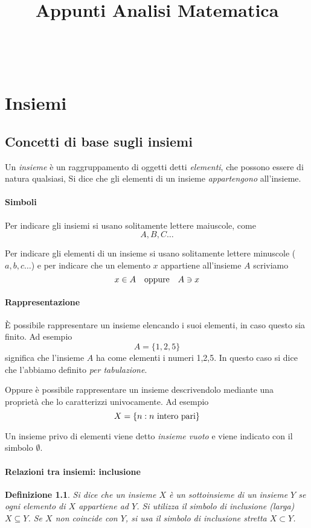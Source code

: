 \documentclass[11pt]{book}
\title{Appunti Analisi Matematica}
\newtheorem{definition}{Definizione}[chapter]
\begin{document}
\tableofcontents
\
\newpage
{}
\chapter{Insiemi}
\section{Concetti di base sugli insiemi}
Un \textit{insieme} è un raggruppamento di oggetti detti \textit{elementi}, che possono essere di natura qualsiasi, Si 
dice che gli elementi di un insieme \textit{appartengono} all'insieme.
\subsubsection{Simboli}
Per indicare gli insiemi si usano solitamente lettere maiuscole, come
\begin{equation*}
    A,B,C\dots
\end{equation*}

Per indicare gli elementi di un insieme si usano solitamente lettere minuscole ($a,b,c\dots$) e per indicare che un elemento 
$x$ appartiene all'insieme $A$ scriviamo
\begin{equation*}
    x\in A \quad \textnormal{oppure} \quad A\ni x
\end{equation*}
\subsubsection{Rappresentazione}
È possibile rappresentare un insieme elencando i suoi elementi, in caso questo sia finito. Ad esempio
\begin{equation*}
    A=\{1,2,5\}
\end{equation*}
significa che l'insieme $A$ ha come elementi i numeri 1,2,5. In questo caso si dice che l'abbiamo definito \textit{per tabulazione}.

Oppure è possibile rappresentare un insieme descrivendolo mediante una proprietà che lo caratterizzi univocamente. Ad esempio
\begin{equation*}
    X=\{n:n \textnormal{ intero pari}\}
\end{equation*}

Un insieme privo di elementi viene detto \textit{insieme vuoto} e viene indicato con il simbolo $\emptyset$.
\subsubsection{Relazioni tra insiemi: inclusione}
\begin{definition}
    Si dice che un insieme $X$ è un sottoinsieme di un insieme $Y$ se ogni elemento di $X$ appartiene ad $Y$. Si utilizza 
    il simbolo di inclusione (larga) $X\subseteq Y$. Se $X$ non coincide con $Y$, si usa il simbolo di inclusione stretta
    $X\subset Y$.
\end{definition}
\end{document}
